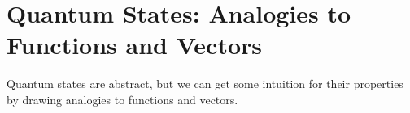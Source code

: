 %
%
%

\section*{Quantum States: Analogies to Functions and Vectors}

	Quantum states are abstract, but we can get some intuition for their properties by drawing analogies to functions and vectors.

